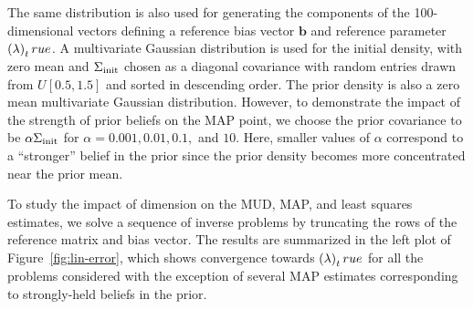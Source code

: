 The same distribution is also used for generating the components of the 100-dimensional vectors defining a reference bias vector $\mathbf{b}$ and reference parameter $\left ( \lambda \right )_true$.
A multivariate Gaussian distribution is used for the initial density, with zero mean and $\Sigma_\text{init}$ chosen as a diagonal covariance with random entries drawn from $U[0.5, 1.5]$ and sorted in descending order.%
The prior density is also a zero mean multivariate Gaussian distribution.
However, to demonstrate the impact of the strength of prior beliefs on the MAP point, we choose the prior covariance to be $\alpha\Sigma_\text{init}$  for $\alpha=0.001, 0.01, 0.1, $ and $10$.
Here, smaller values of $\alpha$ correspond to a ``stronger'' belief in the prior since the prior density becomes more concentrated near the prior mean.


To study the impact of dimension on the MUD, MAP, and least squares estimates, we solve a
sequence of inverse problems by truncating the rows of the reference matrix and bias vector.
%
The results are summarized in the left plot of Figure~\ref{fig:lin-error}, which shows convergence towards $\left ( \lambda \right )_true$ for all the problems considered with the exception of several MAP estimates corresponding to strongly-held beliefs in the prior.



